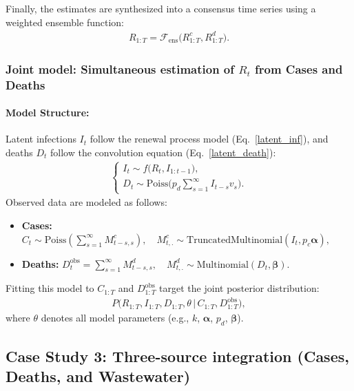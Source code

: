 \documentclass{article}
\begin{document}
Finally, the estimates are synthesized into a consensus time series using a weighted ensemble function:
\begin{align}
R_{1:T} = \mathcal{F}_{\mathrm{ens}}\big(R_{1:T}^c, R_{1:T}^d\big).
\end{align}

\subsubsection{Joint model: Simultaneous estimation of $R_{t}$ from Cases and Deaths}

\paragraph{Model Structure:}
Latent infections $I_{t}$ follow the renewal process model (Eq.~\eqref{latent_inf}), and deaths $D_t$ follow the convolution equation (Eq.~\eqref{latent_death}):
\begin{align}
\begin{cases}
I_t \sim f\big(R_t, I_{1:t-1}\big),\\[4pt]
D_t \sim \mathrm{Poiss}\!\Big( p_d \sum_{s=1}^\infty I_{t-s} v_s \Big).
\end{cases}
\end{align}
Observed data are modeled as follows:
\begin{itemize}
    \item \textbf{Cases:} $C_t \sim \mathrm{Poiss}\left( \sum_{s=1}^\infty M^{c}_{t-s,s} \right), \quad M^{c}_{t,.} \sim \mathrm{TruncatedMultinomial}(I_t, p_c\boldsymbol{\alpha}),$
    \item \textbf{Deaths:} $D^{\text{obs}}_t = \sum_{s=1}^\infty M^{d}_{t-s,s}, \quad M^{d}_{t,.} \sim \mathrm{Multinomial}(D_t, \boldsymbol{\beta}).$
\end{itemize}
Fitting this model to $C_{1:T}$ and $D^{\text{obs}}_{1:T}$ target the joint posterior distribution:
\begin{align}
P\big(R_{1:T}, I_{1:T}, D_{1:T}, \theta \,\big|\, C_{1:T}, D^{\text{obs}}_{1:T}\big),
\end{align}
where $\theta$ denotes all model parameters (e.g., $k$, $\boldsymbol{\alpha}$, $p_d$, $\boldsymbol{\beta}$).


\subsection{Case Study 3: Three-source integration (Cases, Deaths, and Wastewater)}
\end{document}
